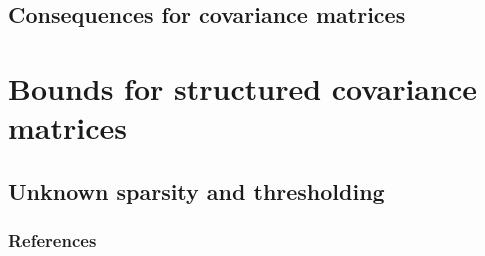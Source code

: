 \documentclass[10pt,handout,english]{beamer}
\begin{document}
\subsection{Consequences for covariance matrices}

\section{Bounds for structured covariance matrices}
\subsection{Unknown sparsity and thresholding}

\begin{frame}[allowframebreaks]
\frametitle{References}


\end{frame}
\end{document}
